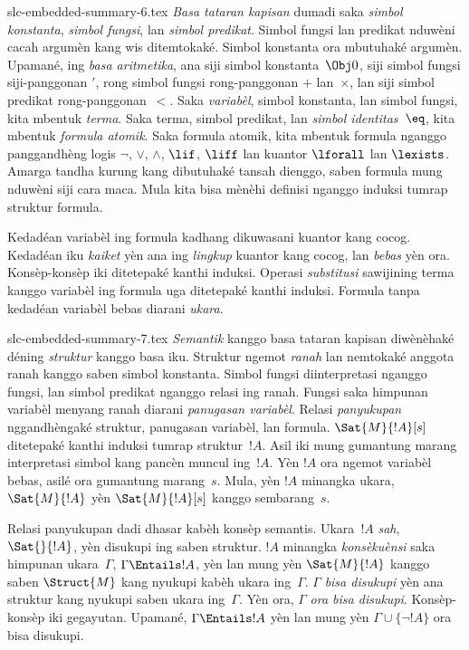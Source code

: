 \begin{filecontents*}[overwrite]{slc-embedded-summary-6.tex}
\emph{Basa tataran kapisan} dumadi saka \emph{simbol konstanta},
\emph{simbol fungsi}, lan \emph{simbol predikat}. Simbol fungsi
lan predikat nduwèni cacah argumèn kang wis ditemtokaké.
Simbol konstanta ora mbutuhaké argumèn. Upamané, ing
\emph{basa aritmetika}, ana siji simbol konstanta~$\Obj 0$,
siji simbol fungsi siji-panggonan $\prime$, rong simbol fungsi
rong-panggonan $+$ lan~$\times$, lan siji simbol predikat
rong-panggonan~$<$. Saka \emph{variabèl}, simbol konstanta,
lan simbol fungsi, kita mbentuk \emph{terma}. Saka terma,
simbol predikat, lan \emph{simbol identitas}~$\eq$, kita
mbentuk \emph{formula atomik}. Saka formula atomik, kita
mbentuk formula nganggo panggandhèng logis $\lnot$, $\lor$,
$\land$, $\lif$, $\liff$ lan kuantor $\lforall$ lan $\lexists$.
Amarga tandha kurung kang dibutuhaké tansah dienggo, saben formula
mung nduwèni siji cara maca. Mula kita bisa mènèhi definisi
nganggo induksi tumrap struktur formula.

Kedadéan variabèl ing formula kadhang dikuwasani kuantor kang
cocog. Kedadéan iku \emph{kaiket} yèn ana ing \emph{lingkup}
kuantor kang cocog, lan \emph{bebas} yèn ora. Konsèp-konsèp
iki ditetepaké kanthi induksi. Operasi \emph{substitusi} sawijining
terma kanggo variabèl ing formula uga ditetepaké kanthi induksi.
Formula tanpa kedadéan variabèl bebas diarani \emph{ukara}.
\end{filecontents*}

\begin{filecontents*}[overwrite]{slc-embedded-summary-7.tex}
\emph{Semantik} kanggo basa tataran kapisan diwènèhaké déning
\emph{struktur} kanggo basa iku. Struktur ngemot \emph{ranah}
lan nemtokaké anggota ranah kanggo saben simbol konstanta.
Simbol fungsi diinterpretasi nganggo fungsi, lan simbol predikat
nganggo relasi ing ranah. Fungsi saka himpunan variabèl menyang
ranah diarani \emph{panugasan variabèl}. Relasi \emph{panyukupan}
nggandhèngaké struktur, panugasan variabèl, lan formula.
$\Sat{M}{!A}[s]$ ditetepaké kanthi induksi tumrap struktur~$!A$.
Asil iki mung gumantung marang interpretasi simbol kang pancèn
muncul ing~$!A$. Yèn $!A$ ora ngemot variabèl bebas, asilé ora
gumantung marang~$s$. Mula, yèn $!A$ minangka ukara,
$\Sat{M}{!A}$ yèn $\Sat{M}{!A}[s]$ kanggo sembarang~$s$.

Relasi panyukupan dadi dhasar kabèh konsèp semantis. Ukara~$!A$
\emph{sah}, $\Sat{{}}{!A}$, yèn disukupi ing saben struktur.
$!A$ minangka \emph{konsèkuènsi} saka himpunan ukara~$\Gamma$,
$\Gamma\Entails !A$, yèn lan mung yèn $\Sat{M}{!A}$ kanggo
saben $\Struct{M}$ kang nyukupi kabèh ukara ing~$\Gamma$.
$\Gamma$ \emph{bisa disukupi} yèn ana struktur kang nyukupi
saben ukara ing~$\Gamma$. Yèn ora, $\Gamma$ \emph{ora bisa disukupi}.
Konsèp-konsèp iki gegayutan. Upamané, $\Gamma\Entails !A$
yèn lan mung yèn $\Gamma\cup\{\lnot !A\}$ ora bisa disukupi.
\end{filecontents*}

